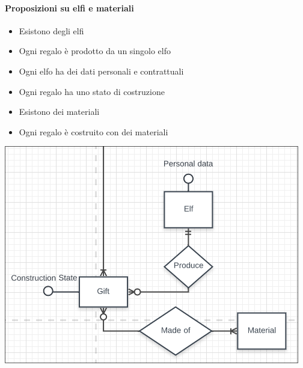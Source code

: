 \documentclass[12pt]{report}
\begin{document}
\paragraph{Proposizioni su elfi e materiali}
\begin{itemize}
  \item Esistono degli elfi
  \item Ogni regalo è prodotto da un singolo elfo
  \item Ogni elfo ha dei dati personali e contrattuali
  \item Ogni regalo ha uno stato di costruzione
  \item Esistono dei materiali
  \item Ogni regalo è costruito con dei materiali
\end{itemize}
\begin{center}
\includegraphics[scale=0.60]{er4.png}
\end{center}
\end{document}
